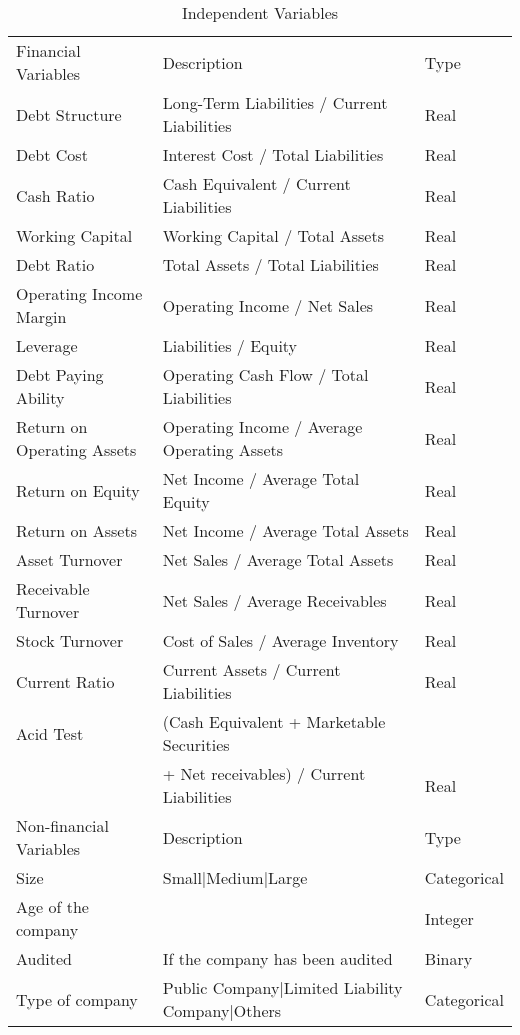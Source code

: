 \documentclass[a4paper,10pt,onecolumn,preprint,3p]{elsarticle}
\begin{document}
\begin{table}[htpb]
\caption{\label{tab:variables} Independent Variables}
\centering
\begin{scriptsize}
\begin{tabular}{lll}
\hline\noalign{\smallskip}
Financial Variables & Description & Type\\
\noalign{\smallskip}\hline\noalign{\smallskip}
Debt Structure & Long-Term Liabilities / Current Liabilities &  Real\\
Debt Cost & Interest Cost / Total Liabilities &  Real\\
Cash Ratio & Cash Equivalent / Current Liabilities &  Real\\
Working Capital & Working Capital / Total Assets &  Real\\
Debt Ratio & Total Assets / Total Liabilities &  Real\\
Operating Income Margin & Operating Income / Net Sales &  Real\\
Leverage & Liabilities / Equity &  Real\\
Debt Paying Ability  & Operating Cash Flow / Total Liabilities  &  Real\\
Return on Operating Assets & Operating Income / Average Operating Assets &  Real\\
Return on Equity & Net Income / Average Total Equity &  Real\\
Return on Assets & Net Income / Average Total Assets &  Real\\
Asset Turnover & Net Sales / Average Total Assets &  Real\\
Receivable Turnover & Net Sales / Average Receivables &  Real\\
Stock Turnover & Cost of Sales / Average Inventory &  Real\\
Current Ratio & Current Assets / Current Liabilities &  Real\\
Acid Test & (Cash Equivalent + Marketable Securities & \\
          & + Net receivables) / Current Liabilities &  Real\\
\noalign{\smallskip} \hline\noalign{\smallskip}
Non-financial Variables & Description & Type\\
\noalign{\smallskip}\hline\noalign{\smallskip}
Size & Small|Medium|Large& Categorical\\
Age of the company & & Integer\\
Audited & If the company has been audited &  Binary\\
Type of company & Public Company|Limited Liability Company|Others & Categorical\\

\end{tabular}
\end{scriptsize}
\end{table}
\end{document}
